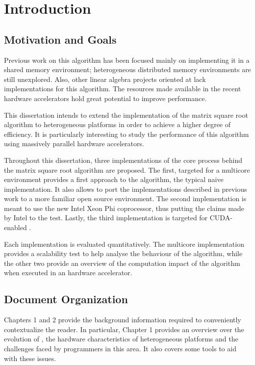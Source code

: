 \documentclass[../thesis]{subfiles}
\begin{document}
	\chapter{Introduction}

	\section{Motivation and Goals}
	Previous work on this algorithm has been focused mainly on implementing it in a \cpu shared memory environment; heterogeneous distributed memory environments are still unexplored. Also, other linear algebra projects oriented at \gpus lack implementations for this algorithm. The resources made available in the recent hardware accelerators hold great potential to improve performance.

	This dissertation intends to extend the implementation of the matrix square root algorithm to heterogeneous platforms in order to achieve a higher degree of efficiency. It is particularly interesting to study the performance of this algorithm using massively parallel hardware accelerators.

	Throughout this dissertation, three implementations of the core process behind the matrix square root algorithm are proposed. The first, targeted for a multicore environment provides a first approach to the algorithm, the typical naive implementation. It also allows to port the implementations described in previous work to a more familiar open source environment. The second implementation is meant to use the new Intel Xeon Phi coprocessor, thus putting the claims made by Intel to the test. Lastly, the third implementation is targeted for CUDA-enabled \gpus.

	Each implementation is evaluated quantitatively. The multicore implementation provides a scalability test to help analyse the behaviour of the algorithm, while the other two provide an overview of the computation impact of the algorithm when executed in an hardware accelerator.

	\section{Document Organization}
	Chapters 1 and 2 provide the background information required to conveniently contextualize the reader. In particular, Chapter 1 provides an overview over the evolution of \hpc, the hardware characteristics of heterogeneous platforms and the challenges faced by programmers in this area. It also covers some tools to aid with these issues.
\end{document}
